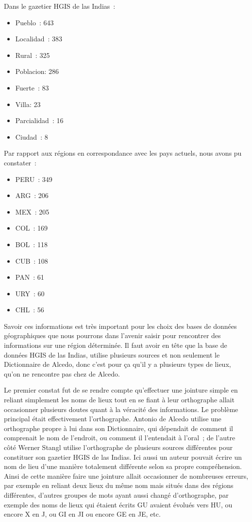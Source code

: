 \documentclass[a4paper,12pt,twoside]{book}
\begin{document}
Dans le gazetier HGIS de las Indias :\\

\begin{itemize}
\item Pueblo : 643
\item Localidad : 383
\item Rural : 325
\item Poblacion: 286
\item Fuerte : 83
\item Villa: 23
\item Parcialidad : 16
\item Ciudad : 8\\
\end{itemize}
Par rapport aux régions en correspondance avec les pays actuels, nous avons pu constater :\\
\begin{itemize}
\item PERU : 349
\item ARG : 206
\item MEX : 205
\item COL : 169
\item BOL : 118
\item CUB : 108
\item PAN : 61
\item URY : 60
\item CHL : 56\\
\end{itemize}

Savoir ces informations est très important pour les choix des bases de données géographiques que nous pourrons dans l’avenir saisir pour rencontrer des informations sur une région déterminée. Il faut avoir en tête que la base de données HGIS de las Indias, utilise plusieurs sources et non seulement le Dictionnaire de Alcedo, donc c’est pour ça qu’il y a plusieurs types de lieux, qu’on ne rencontre pas chez de Alcedo.

Le premier constat fut de se rendre compte qu’effectuer une jointure simple en reliant simplement les noms de lieux tout en se fiant à leur orthographe allait occasionner plusieurs doutes quant à la véracité des informations. Le problème principal était effectivement l’orthographe. Antonio de Alcedo utilise une orthographe propre à lui dans son Dictionnaire, qui dépendait de comment il comprenait le nom de l’endroit, ou comment il l’entendait à l’oral ; de l’autre côté Werner Stangl utilise l’orthographe de plusieurs sources différentes pour constituer son gazetier HGIS de las Indias. Ici aussi un auteur pouvait écrire un nom de lieu d’une manière totalement différente selon sa propre compréhension. Ainsi de cette manière faire une jointure allait occasionner de nombreuses erreurs, par exemple en reliant deux lieux du même nom mais situés dans des régions différentes, d’autres groupes de mots ayant aussi changé d’orthographe, par exemple des noms de lieux qui étaient écrits GU avaient évolués vers HU, ou encore X en J, ou GI en JI ou encore GE en JE, etc.    	
\end{document}
